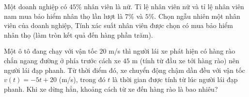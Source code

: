 \begin{ex}
	Một doanh nghiệp có $45\%$ nhân viên là nữ. Tỉ lệ nhân viên nữ và tỉ lệ nhân viên nam mua bảo hiểm nhân thọ lần lượt là $7\%$ và $5\%$. Chọn ngẫu nhiên một nhân viên của doanh nghiệp, Tính xác suất nhân viên được chọn có mua bảo hiểm nhân thọ (làm tròn kết quả đến hàng phần trăm).
\end{ex}

\begin{ex}
	Một ô tô đang chạy với vận tốc $20$ m/s thì người lái xe phát hiện có hàng rào chắn ngang đường ở phía trước cách xe $45$ m (tính từ đầu xe tới hàng rào) nên người lái đạp phanh. Từ thời điểm đó, xe chuyển động chậm dần đều với vận tốc $v(t)=-5t+20$ (m/s), trong đó $t$ là thời gian được tính từ lúc người lái đạp phanh. Khi xe dừng hẳn, khoảng cách từ xe đến hàng rào là bao nhiêu?
\end{ex}

